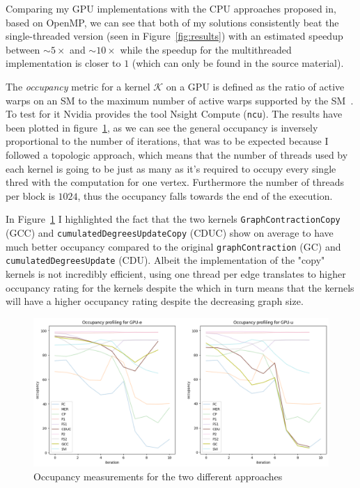\documentclass[a4paper,10pt]{article}
\begin{document}
Comparing my GPU implementations with the CPU approaches proposed in\cite{generic-he-boruvka}, based on OpenMP, we can see that both of my solutions consistently beat the single-threaded version (seen in Figure~\ref{fig:results}) with an estimated speedup between $\sim5\times$ and $\sim10\times$ while the speedup for the multithreaded implementation is closer to $1$ (which can only be found in the source material).

\medskip
The \emph{occupancy} metric for a kernel $\mathcal{K}$ on a GPU is defined as the ratio of active warps on an SM to the maximum number of active warps supported by the SM~\cite{def-occupancy}. To test for it Nvidia provides the tool Nsight Compute (\texttt{ncu}). The results have been plotted in figure~\ref{fig:occupancy}, as we can see the general occupancy is inversely proportional to the number of iterations, that was to be expected because I followed a topologic approach, which means that the number of threads used by each kernel is going to be just as many as it's required to occupy every single thred with the computation for one vertex. Furthermore the number of threads per block is $1024$, thus the occupancy falls towards the end of the execution.

In Figure~\ref{fig:occupancy} I highlighted the fact that the two kernels \texttt{GraphContractionCopy} (GCC) and \texttt{cumulatedDegreesUpdateCopy} (CDUC) show on average to have much better occupancy compared to the original \texttt{graphContraction} (GC) and \texttt{cumulatedDegreesUpdate} (CDU). Albeit the implementation of the "copy" kernels is not incredibly efficient, using one thread per edge translates to higher occupancy rating for the kernels despite the  which in turn means that the kernels will have a higher occupancy rating despite the decreasing graph size.
\begin{figure}[!h]
	\centering
	\includegraphics[scale=0.5]{fig/occupancy.png}
	\caption{Occupancy measurements for the two different approaches}
	\label{fig:occupancy}
\end{figure}
\end{document}
